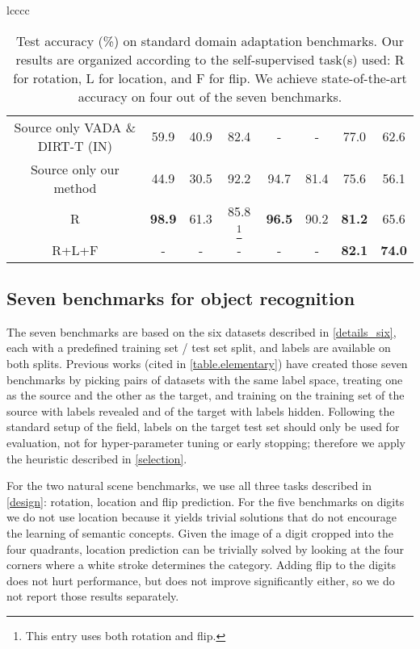 \documentclass{article} \usepackage{iclr2020_conference,times}
\begin{document}
\begin{wraptable}{r}{0.45\textwidth}
\begin{tabular}{lcccc}
\begin{table*}[t!]
\begin{center}
{\begin{tabular}{cccccccc}
Source only VADA \& DIRT-T (IN)
					& 59.9 	& 40.9			& 82.4		& -				& - 			& 77.0		& 62.6\\
Source only our method
					& 44.9 	& 30.5			& 92.2		& 94.7		& 81.4 		& 75.6		& 56.1\\
\hline
R  & \textbf{98.9} & 61.3	& 85.8
\footnote{This entry uses both rotation and flip.}
							& \textbf{96.5}	& 90.2	& \textbf{81.2}	& 65.6\\
R+L+F		& -	& -	& -	& -	& -	& \textbf{82.1}	& \textbf{74.0}\\
\hline
\end{tabular}
}
\end{center}
\caption{
  Test accuracy (\%) on standard domain adaptation benchmarks.
  Our results are organized according to the self-supervised task(s) used: R for rotation, L for location, and F for flip.
  We achieve state-of-the-art accuracy on four out of the seven benchmarks.
} 
\vspace{-1ex}
\label{table.elementary}
\end{table*} 


\subsection{Seven benchmarks for object recognition}
The seven benchmarks are based on the six datasets described in \autoref{details_six}, each with a predefined training set / test set split, and labels are available on both splits. 
Previous works (cited in \autoref{table.elementary}) have created those seven benchmarks by picking pairs of datasets with the same label space, treating one as the source and the other as the target, 
and training on the training set of the source with labels revealed and of the target with labels hidden.
Following the standard setup of the field, labels on the target test set should only be used for evaluation, not for hyper-parameter tuning or early stopping; 
therefore we apply the heuristic described in \autoref{selection}.

For the two natural scene benchmarks, we use all three tasks described in \autoref{design}: rotation, location and flip prediction. 
For the five benchmarks on digits we do not use location because it yields trivial solutions that do not encourage the learning of semantic concepts.
Given the image of a digit cropped into the four quadrants, location prediction can be trivially solved by looking at the four corners where a white stroke determines the category.
Adding flip to the digits does not hurt performance, but does not improve significantly either, so we do not report those results separately.


\end{tabular}
\end{wraptable}
\end{document}
